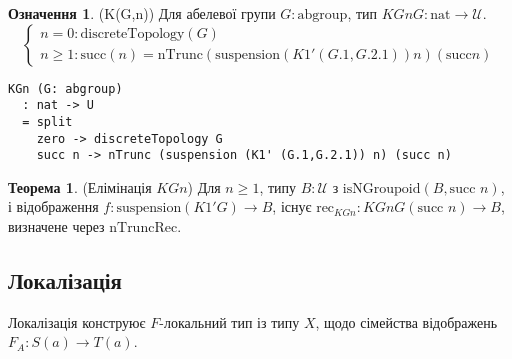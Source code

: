 \documentclass{article}
\theoremstyle{definition}
\newtheorem{theorem}{Теорема}
\newtheorem{definition}{Означення}
\begin{document}
\begin{definition} (K(G,n))
Для абелевої групи \( G : \text{abgroup} \), тип \( KGn G : \text{nat} \to \mathcal{U} \).
\[
\begin{cases}
n = 0: \text{discreteTopology}(G) \\
n \geq 1: \text{succ}(n) = \text{nTrunc}(\text{suspension}(K1' (G.1, G.2.1)) n) (\text{succ} n)
\end{cases}
\]
\begin{lstlisting}
KGn (G: abgroup)
  : nat -> U
  = split
    zero -> discreteTopology G
    succ n -> nTrunc (suspension (K1' (G.1,G.2.1)) n) (succ n)
\end{lstlisting}
\end{definition}

\begin{theorem} (Елімінація \( KGn \))
Для \( n \geq 1 \), типу \( B : \mathcal{U} \) з \( \text{isNGroupoid}(B, \text{succ } n) \),
і відображення \( f : \text{suspension}(K1' G) \to B \), існує
\( \text{rec}_{KGn} : KGn G (\text{succ } n) \to B \),
визначене через \( \text{nTruncRec} \).
\end{theorem}

\subsection{Локалізація}
Локалізація конструює \( F \)-локальний тип із типу \( X \),
щодо сімейства відображень \( F_A : S(a) \to T(a) \).
\end{document}
